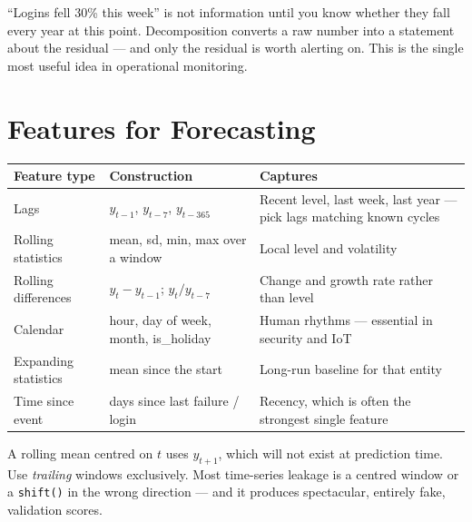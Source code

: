 \begin{conceptbox}
``Logins fell 30\% this week'' is not information until you know whether they fall
every year at this point. Decomposition converts a raw number into a statement
about the residual --- and only the residual is worth alerting on. This is the
single most useful idea in operational monitoring.
\end{conceptbox}

\section{Features for Forecasting}

\begin{longtable}{@{}L{3.1cm}L{4.6cm}L{6.5cm}@{}}
\toprule
{}
\textbf{Feature type} & \textbf{Construction} & \textbf{Captures} \\
\midrule
\endhead
Lags & $y_{t-1}$, $y_{t-7}$, $y_{t-365}$ & Recent level, last week, last year --- pick lags matching known cycles \\
Rolling statistics & mean, sd, min, max over a window & Local level and volatility \\
Rolling differences & $y_t - y_{t-1}$; $y_t / y_{t-7}$ & Change and growth rate rather than level \\
Calendar & hour, day of week, month, is\_holiday & Human rhythms --- essential in security and IoT \\
Expanding statistics & mean since the start & Long-run baseline for that entity \\
Time since event & days since last failure / login & Recency, which is often the strongest single feature \\
\bottomrule
\end{longtable}

\begin{alertbox}
A rolling mean centred on $t$ uses $y_{t+1}$, which will not exist at prediction
time. Use \emph{trailing} windows exclusively. Most time-series leakage is a
centred window or a \texttt{shift()} in the wrong direction --- and it produces
spectacular, entirely fake, validation scores.
\end{alertbox}

\Needspace*{0.4\textheight}
